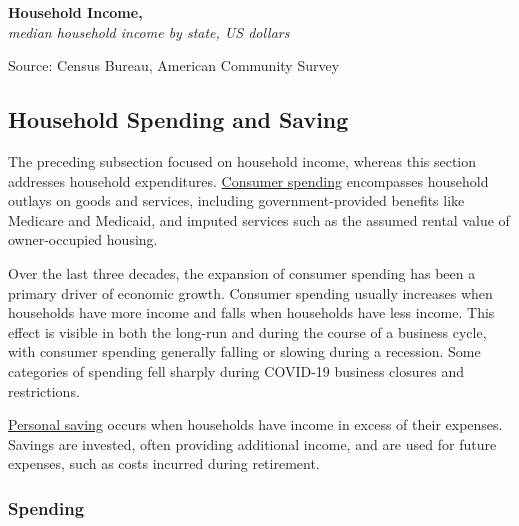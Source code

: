 \documentclass{report}
\newcommand{\tbllink}[1]{\href{https://raw.githubusercontent.com/bdecon/US-chartbook/master/chartbook/data/#1}{\faTable}}
\begin{document}
{\normalsize \textbf{Household Income, }\\
\footnotesize{\textit{median household income by state, US dollars}}
\vspace{-3mm}

\hspace{-5mm} 
\vspace{-6mm}

\begin{minipage}{0.76\textwidth} 
\footnotesize{Source: Census Bureau, American Community Survey} \hfill \tbllink{median_hh_inc_state.csv}
\end{minipage}
\newpage 
\begin{minipage}{0.76\textwidth}  
\subsection*{Household Spending and Saving}
\hypertarget{hhss}{\label{hhss}} 
\small The preceding subsection focused on household income, whereas this section addresses household expenditures. \href{https://www.bea.gov/data/consumer-spending/main}{Consumer spending} encompasses household outlays on goods and services, including government-provided benefits like Medicare and Medicaid, and imputed services such as the assumed rental value of owner-occupied housing.

Over the last three decades, the expansion of consumer spending has been a primary driver of economic growth. Consumer spending usually increases when households have more income and falls when households have less income. This effect is visible in both the long-run and during the course of a business cycle, with consumer spending generally falling or slowing during a recession. Some categories of spending fell sharply during COVID-19 business closures and restrictions.

\href{https://www.bea.gov/data/income-saving/personal-saving-rate}{Personal saving} occurs when households have income in excess of their expenses. Savings are invested, often providing additional income, and are used for future expenses, such as costs incurred during retirement.
\vspace{1mm}

\subsubsection*{Spending}
\vspace{-1mm}


\end{minipage}}
\end{document}
